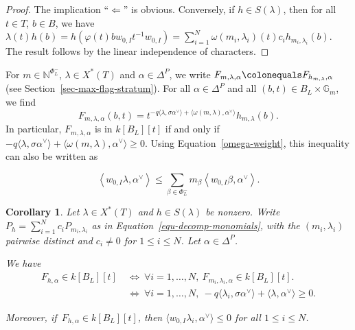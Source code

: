 \documentclass[11pt]{amsart}
\numberwithin{equation}{section}
\newtheorem{corollary}[theorem]{Corollary}
\theoremstyle{definition}
\theoremstyle{remark}
\newcommand{\GG}{\mathbb{G}}
\newcommand{\NN}{\mathbb{N}}
\begin{document}
\begin{proof}
  The implication ``$\Leftarrow$'' is obvious. Conversely, if $h\in S(\lambda)$, then for all $t\in T$, $b\in B$, we have
  $\lambda(t)h(b)=h(\varphi(t)bw_{0,I}t^{-1} w_{0,I})=\sum_{i=1}^N \omega(m_i,\lambda_i)(t) c_i  h_{m_i,\lambda_i}(b)$. 
 The result follows by the linear independence of characters.
\end{proof}

For $m\in \NN^{\Phi^{-}_{L}}$, $\lambda\in X^*(T)$ and $\alpha\in \Delta^P$, we write $F_{m,\lambda,\alpha}\colonequals F_{h_{m,\lambda},\alpha}$ (see Section~\ref{sec-max-flag-stratum}). For all $\alpha\in \Delta^P$ and all $(b,t)\in B_L\times \GG_m$, we find 
\begin{equation}\label{equ-Fmlambda}
F_{m,\lambda,\alpha}(b,t)=t^{-q\langle \lambda,\sigma\alpha^\vee \rangle + \langle \omega(m,\lambda),\alpha^\vee \rangle}h_{m,\lambda}(b).
\end{equation}
In particular, $F_{m,\lambda,\alpha}$ is in $k[B_L][t]$ if and only if $-q\langle \lambda, \sigma \alpha^\vee \rangle + \langle \omega(m,\lambda),\alpha^\vee \rangle \geq 0$. Using Equation~\eqref{omega-weight}, this inequality can also be written as 

\begin{equation}\label{equ-equivalent-ineq}
\left\langle w_{0,I}\lambda,\alpha^\vee \right\rangle \leq \sum_{\beta\in \Phi^{-}_{L}}m_\beta \left\langle w_{0,I}\beta,\alpha^\vee \right\rangle.
\end{equation}

\begin{corollary}\label{cor-monomials-DeltaP}
Let $\lambda\in X^*(T)$ and $h\in S(\lambda)$ be nonzero. Write $P_h=\sum_{i=1}^N c_{i} P_{m_i,\lambda_i}$ as in Equation~\eqref{equ-decomp-monomials}, with the $(m_i,\lambda_i)$ pairwise distinct and $c_i\neq 0$ for $1\leq i \leq N$. Let $\alpha\in \Delta^P$.
\begin{assertionlist}
\item \label{cor-monomials-DeltaP-item1} We have
\begin{align}
F_{h,\alpha}\in k[B_L][t] \ &\Longleftrightarrow \ \forall i=1, \dots ,N, \ F_{m_i,\lambda_i,\alpha}\in k[B_L][t].\\
&\Longleftrightarrow \ \forall i=1, \dots ,N, \ -q\langle \lambda_i,\sigma\alpha^\vee \rangle +\langle \lambda, \alpha^\vee \rangle\geq 0.
\end{align}
\item\label{cor-monomials-DeltaP-item2} Moreover, if\, $F_{h,\alpha}\in k[B_L][t]$, then $\langle w_{0,I}\lambda_i,\alpha^\vee \rangle \leq 0$ for all $1\leq i \leq N$.
\end{assertionlist}
\end{corollary}
\end{document}
